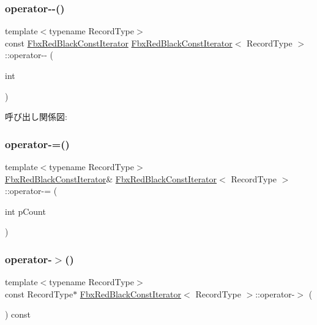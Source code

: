\subsubsection{\texorpdfstring{operator-\/-\/()}{operator--()}\hspace{0.1cm}{\footnotesize\ttfamily [2/2]}}
{\footnotesize\ttfamily template$<$typename Record\+Type$>$ \\
const \hyperlink{class_fbx_red_black_const_iterator}{Fbx\+Red\+Black\+Const\+Iterator} \hyperlink{class_fbx_red_black_const_iterator}{Fbx\+Red\+Black\+Const\+Iterator}$<$ Record\+Type $>$\+::operator-\/-\/ (\begin{DoxyParamCaption}\item[{int}]{ }\end{DoxyParamCaption})}

呼び出し関係図\+:
\mbox{\label{class_fbx_red_black_const_iterator_a8d6e308711ba1c94309dd7f9efde946d}} 
\subsubsection{\texorpdfstring{operator-\/=()}{operator-=()}}
{\footnotesize\ttfamily template$<$typename Record\+Type$>$ \\
\hyperlink{class_fbx_red_black_const_iterator}{Fbx\+Red\+Black\+Const\+Iterator}\& \hyperlink{class_fbx_red_black_const_iterator}{Fbx\+Red\+Black\+Const\+Iterator}$<$ Record\+Type $>$\+::operator-\/= (\begin{DoxyParamCaption}\item[{int}]{p\+Count }\end{DoxyParamCaption})}

\mbox{\label{class_fbx_red_black_const_iterator_add2e613de14418803884f3b8318d35a1}} 
\subsubsection{\texorpdfstring{operator-\/$>$()}{operator->()}\hspace{0.1cm}{\footnotesize\ttfamily [1/2]}}
{\footnotesize\ttfamily template$<$typename Record\+Type$>$ \\
const Record\+Type$\ast$ \hyperlink{class_fbx_red_black_const_iterator}{Fbx\+Red\+Black\+Const\+Iterator}$<$ Record\+Type $>$\+::operator-\/$>$ (\begin{DoxyParamCaption}{ }\end{DoxyParamCaption}) const}

